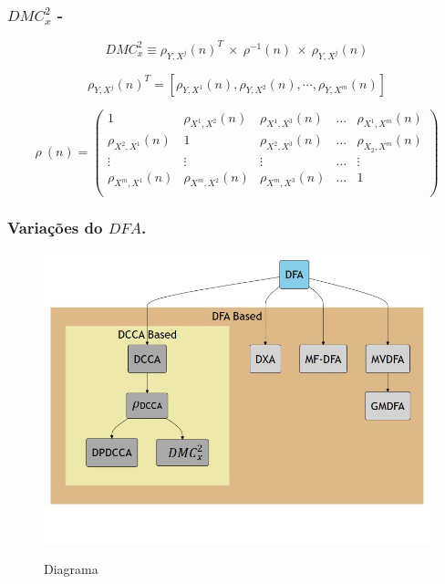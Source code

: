 \documentclass[11pt, aspectratio=169]{beamer}
\newcommand{\dmc}{\(DMC_x^2\) }
\newcommand{\dfa}{$DFA$}
\begin{document}
\begin{frame}
  \frametitle{\dmc - \cite{Zebende2018}}

  \begin{equation}
  {DMC}_{x}^{2}  \equiv \rho_{Y,X^{j}}(n)^{T} ~\times ~ \rho^{-1}(n) ~\times ~\rho_{Y,X^{j}}(n)
  \label{eq:dmc}
\end{equation}

\begin{equation} \label{eq:rho_vec_col}
  \rho_{Y,X^{j}}(n)^T=[\rho_{Y,X^1}(n), \rho_{Y,X^2}(n),\cdots,\rho_{Y,X^m}(n)]
\end{equation}

\begin{equation}
  \rho~(n) = \left(\begin{matrix}
    1                     & \rho_{X^{1},X^{2}}(n) & \rho_{X^{1},X^{3}}(n) & \dots & \rho_{X^{1},X^{m}}(n) \\
    \rho_{X^{2},X^{1}}(n) & 1                     & \rho_{X^{2},X^{3}}(n) & \dots & \rho_{X_{2},X^{m}}(n) \\
    \vdots                & \vdots                & \vdots                & \dots & \vdots                \\
    \rho_{X^{m},X^{1}}(n) & \rho_{X^{m},X^{2}}(n) & \rho_{X^{m},X^{3}}(n) & \dots & 1                     \\
  \end{matrix}\right)
  \label{eq:p_dcca_matrix}
\end{equation}

\end{frame}

\begin{frame}
  \frametitle{Variações do \dfa.}
   \begin{figure}[!htb]
    \centering
    \caption{Diagrama}
    \includegraphics[height=.8\paperheight]{./diag_revisao.jpeg}
    \label{fig:diag_revisao}
  \end{figure}
\end{frame}
\end{document}
